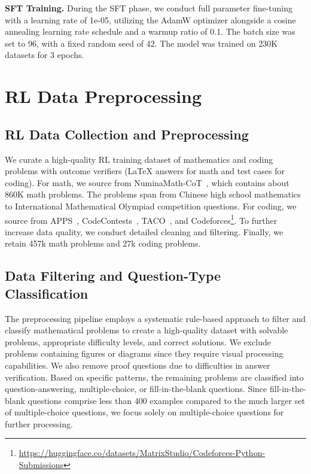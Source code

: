 \textbf{SFT Training.}  During the SFT phase, we conduct full parameter fine-tuning with a learning rate of 1e-05, utilizing the AdamW optimizer alongside a cosine annealing learning rate schedule and a warmup ratio of 0.1. The batch size was set to 96, with a fixed random seed of 42. The model was trained on 230K datasets for 3 epochs.









\section{RL Data Preprocessing}
\label{sec:rl_data_process}
\subsection{RL Data Collection and Preprocessing}

We curate a high-quality RL training dataset of mathematics and coding problems with outcome verifiers (LaTeX answers for math and test cases for coding). For math, we source from NuminaMath-CoT~\citep{li2024numinamath},  which contains about 860K math problems. The problems span from Chinese high school mathematics to International Mathematical Olympiad competition questions. For coding, we source from APPS~\citep{apps}, CodeContests~\citep{li2022competition}, TACO~\citep{li2023taco}, and Codeforces\footnote{\url{https://huggingface.co/datasets/MatrixStudio/Codeforces-Python-Submissions}}. To further increase data quality, we conduct detailed cleaning and filtering. Finally, we retain 457k math problems and 27k coding problems.

\subsection{Data Filtering and Question-Type Classification}

The preprocessing pipeline employs a systematic rule-based approach to filter and classify mathematical problems to create a high-quality dataset with solvable problems, appropriate difficulty levels, and correct solutions. We exclude problems containing figures or diagrams since they require visual processing capabilities. We also remove proof questions due to difficulties in answer verification. Based on specific patterns, the remaining problems are classified into question-answering, multiple-choice, or fill-in-the-blank questions. Since fill-in-the-blank questions comprise less than 400 examples compared to the much larger set of multiple-choice questions, we focus solely on multiple-choice questions for further processing.

